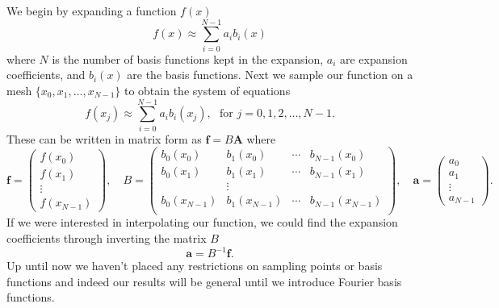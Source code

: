 \documentclass[preprint, amsmath, amssymb]{revtex4-1}
\begin{document}
We begin by expanding a function $f(x)$
\begin{equation} \label{eq:expansion}
  f(x) \approx \sum_{i = 0}^{N - 1} a_i b_i(x)
\end{equation}
where $N$ is the number of basis functions kept in the expansion, $a_i$ are expansion coefficients, and $b_i(x)$ are the basis functions. Next we sample our function on a mesh $\{x_0, x_1, \dots, x_{N-1}\}$ to obtain the system of equations
\begin{equation} \label{eq:sample_expansion}
  f(x_j) \approx \sum_{i=0}^{N-1} a_i b_i(x_j), \hspace{8pt} \mathrm{for} \hspace{4pt} j = 0, 1, 2, \dots, N-1.
\end{equation}
These can be written in matrix form as $\mathbf{f} = B \mathbf{A}$ where
\begin{equation}
  \mathbf{f} =
  \begin{pmatrix}
    f(x_0) \\
    f(x_1) \\
    \vdots \\
    f(x_{N-1})
  \end{pmatrix},
  \hspace{12pt}
  B =
  \begin{pmatrix}
    b_0(x_0) & b_1(x_0) & \cdots & b_{N-1}(x_0) \\
    b_0(x_1) & b_1(x_1) & \cdots & b_{N-1}(x_1) \\
             &   \vdots & & \\
    b_0(x_{N-1}) & b_1(x_{N-1}) & \cdots & b_{N-1}(x_{N-1}) \\
  \end{pmatrix},
  \hspace{12pt}
  \mathbf{a} =
  \begin{pmatrix}
    a_0 \\
    a_1 \\
    \vdots \\
    a_{N-1}
  \end{pmatrix}.
\end{equation}
  If we were interested in interpolating our function, we could find the expansion coefficients through inverting the matrix $B$
  \begin{equation} \label{eq:coefficients}
    \mathbf{a} = B^{-1} \mathbf{f}.
  \end{equation}
  Up until now we haven't placed any restrictions on sampling points or basis functions and indeed our results will be general until we introduce Fourier basis functions.
  
\end{document}
